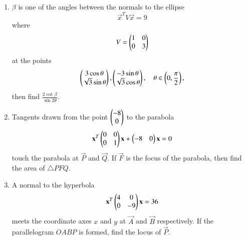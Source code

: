 \documentclass[journal,12pt,twocolumn]{IEEEtran}
\begin{document}
\begin{enumerate}[label=\arabic*.]
%
\item $\beta$ is one of the angles between the normals to the ellipse
\begin{equation}
\vec{x}^TV\vec{x} =9
\end{equation}
%
where
\begin{equation}
V = \begin{pmatrix}1 & 0 \\ 0 & 3\end{pmatrix}
\end{equation}
%
at the points
\begin{equation}
\begin{pmatrix}3\cos\theta\\ \sqrt{3}\sin \theta\end{pmatrix},
\begin{pmatrix}-3\sin\theta\\ \sqrt{3}\cos \theta\end{pmatrix}, \quad \theta \in \left(0,\frac{\pi}{2}\right),
\end{equation}
then find $\frac{2\cot \beta}{\sin 2\theta}$.
\item Tangents drawn from the point $\begin{pmatrix}-8\\0\end{pmatrix}$ to the parabola
\begin{equation}
\mathbf{x}^T\begin{pmatrix}0 & 0 \\ 0 & 1\end{pmatrix}\mathbf{x} + \begin{pmatrix}-8 & 0\end{pmatrix}\mathbf{x} 
 = 0
\end{equation}
%
touch the parabola at $\vec{P}$ and  $\vec{Q}$. If $\vec{F}$ is the focus of the parabola, then find the area 
of $\triangle PFQ$.
\item A normal to the hyperbola 
\begin{equation}
\mathbf{x}^T\begin{pmatrix}4 & 0 \\ 0 & -9\end{pmatrix}\mathbf{x} 
 = 36
\end{equation}
%
meets the coordinate axes $x$ and $y$ at $\vec{A}$ and $\vec{B}$ respectively.  If the parallelogram $OABP$ is 
formed, find the locus of $\vec{P}$.

\end{enumerate}
\end{document}
